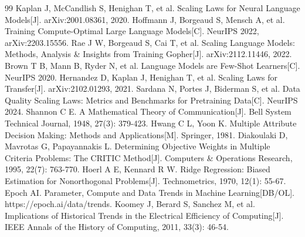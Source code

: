 \documentclass[bwprint]{gmcmthesis}
\begin{document}
\begin{thebibliography}{99}
 Kaplan J, McCandlish S, Henighan T, et al. Scaling Laws for Neural Language Models[J]. arXiv:2001.08361, 2020.
 Hoffmann J, Borgeaud S, Mensch A, et al. Training Compute-Optimal Large Language Models[C]. NeurIPS 2022, arXiv:2203.15556.
 Rae J W, Borgeaud S, Cai T, et al. Scaling Language Models: Methods, Analysis \& Insights from Training Gopher[J]. arXiv:2112.11446, 2022.
 Brown T B, Mann B, Ryder N, et al. Language Models are Few-Shot Learners[C]. NeurIPS 2020.
 Hernandez D, Kaplan J, Henighan T, et al. Scaling Laws for Transfer[J]. arXiv:2102.01293, 2021.
 Sardana N, Portes J, Biderman S, et al. Data Quality Scaling Laws: Metrics and Benchmarks for Pretraining Data[C]. NeurIPS 2024.
 Shannon C E. A Mathematical Theory of Communication[J]. Bell System Technical Journal, 1948, 27(3): 379-423.
 Hwang C L, Yoon K. Multiple Attribute Decision Making: Methods and Applications[M]. Springer, 1981.
 Diakoulaki D, Mavrotas G, Papayannakis L. Determining Objective Weights in Multiple Criteria Problems: The CRITIC Method[J]. Computers \& Operations Research, 1995, 22(7): 763-770.
 Hoerl A E, Kennard R W. Ridge Regression: Biased Estimation for Nonorthogonal Problems[J]. Technometrics, 1970, 12(1): 55-67.
 Epoch AI. Parameter, Compute and Data Trends in Machine Learning[DB/OL]. https://epoch.ai/data/trends.
 Koomey J, Berard S, Sanchez M, et al. Implications of Historical Trends in the Electrical Efficiency of Computing[J]. IEEE Annals of the History of Computing, 2011, 33(3): 46-54.
\end{thebibliography}

\begin{appendices}


\end{appendices}
\end{document}
